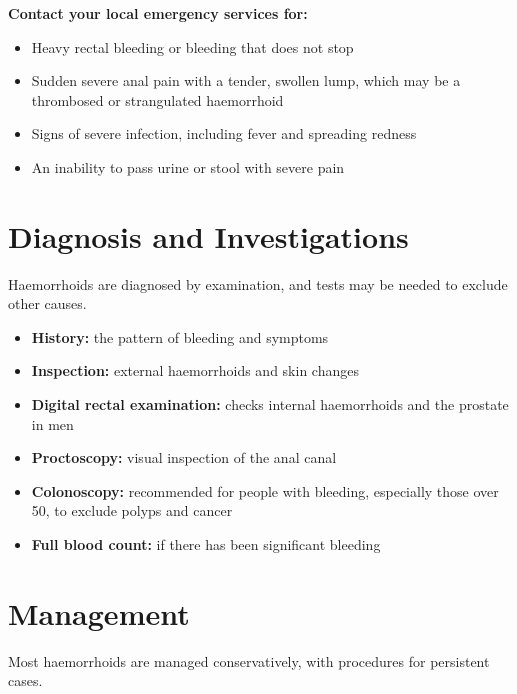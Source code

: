 \textbf{Contact your local emergency services for:}
\begin{itemize}
    \item Heavy rectal bleeding or bleeding that does not stop
    \item Sudden severe anal pain with a tender, swollen lump, which may be a thrombosed or strangulated haemorrhoid
    \item Signs of severe infection, including fever and spreading redness
    \item An inability to pass urine or stool with severe pain
\end{itemize}

\section*{Diagnosis and Investigations}
Haemorrhoids are diagnosed by examination, and tests may be needed to exclude other causes.

\begin{itemize}
    \item \textbf{History:} the pattern of bleeding and symptoms
    \item \textbf{Inspection:} external haemorrhoids and skin changes
    \item \textbf{Digital rectal examination:} checks internal haemorrhoids and the prostate in men
    \item \textbf{Proctoscopy:} visual inspection of the anal canal
    \item \textbf{Colonoscopy:} recommended for people with bleeding, especially those over 50, to exclude polyps and cancer
    \item \textbf{Full blood count:} if there has been significant bleeding
\end{itemize}

\section*{Management}
Most haemorrhoids are managed conservatively, with procedures for persistent cases.

